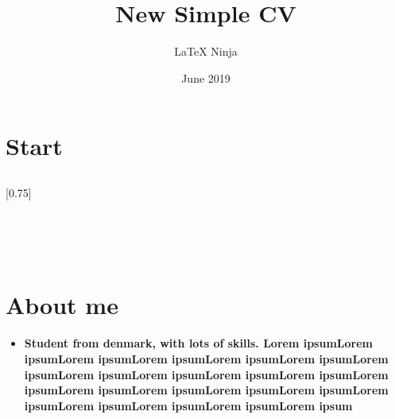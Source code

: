 \documentclass[lighthipster]{simplehipstercv}
\title{New Simple CV}
\author{\LaTeX{} Ninja}
\date{June 2019}
\begin{document}
    \thispagestyle{empty}

    \section*{Start}


    \subsection*{}
    \vspace{4em}

    \setlength{\columnsep}{1.5cm}
    [0.75]
    \begin{paracol}{2}

        \footnotesize
        {\setasidefontcolour
        \flushright
            \begin{center}
            \end{center}


             \\[0.5em]
            \bigskip
             \\[0.5em]
            \bigskip
             \\[0.5em]
            \bigskip

        }

        \switchcolumn

        \small
        \section*{About me}
        \begin{itemize}
            \item \textbf{Student from denmark, with lots of skills. Lorem ipsumLorem ipsumLorem ipsumLorem ipsumLorem ipsumLorem ipsumLorem ipsumLorem ipsumLorem ipsumLorem ipsumLorem ipsumLorem ipsumLorem ipsumLorem ipsumLorem ipsumLorem ipsumLorem ipsumLorem ipsumLorem ipsumLorem ipsumLorem ipsum}
        \end{itemize}

        \vspace{3em}


\end{paracol}
\end{document}
